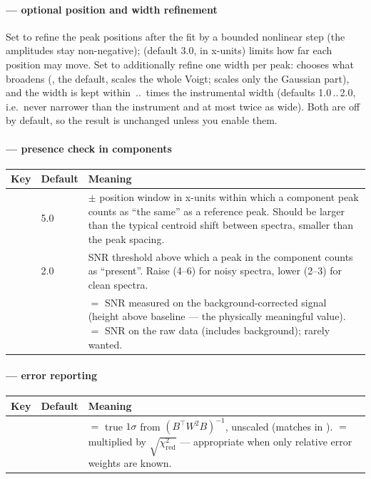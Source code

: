 \documentclass[11pt,a4paper]{article}
\begin{document}
\paragraph{\code{[refine]} --- optional position and width refinement}
Set  to refine the peak positions after the fit by a bounded
nonlinear step (the amplitudes stay non-negative);  (default
3.0, in x-units) limits how far each position may move. Set
 to additionally refine one width per peak:
 chooses what broadens (, the default, scales the
whole Voigt;  scales only the Gaussian part), and the width is kept
within \,..\, times the instrumental
width (defaults 1.0\,..\,2.0, i.e.\ never narrower than the instrument and at most
twice as wide). Both are off by default, so the result is unchanged unless you
enable them.

\paragraph{\code{[presence]} --- presence check in components}
\begin{table}[h]\small\centering
\begin{tabularx}{\linewidth}{@{}l l L@{}}
\toprule
\textbf{Key} & \textbf{Default} & \textbf{Meaning}\\
\midrule
{} & 5.0 & $\pm$ position window in x-units within which a component peak counts as ``the same'' as a reference peak. Should be larger than the typical centroid shift between spectra, smaller than the peak spacing.\\
 & 2.0 & SNR threshold above which a peak in the component counts as ``present''. Raise (4--6) for noisy spectra, lower (2--3) for clean spectra.\\
 &  &  $=$ SNR measured on the background-corrected signal (height above baseline --- the physically meaningful value).  $=$ SNR on the raw data (includes background); rarely wanted.\\
\bottomrule
\end{tabularx}
\end{table}

\paragraph{\code{[errors]} --- error reporting}
\begin{table}[h]\small\centering
\begin{tabularx}{\linewidth}{@{}l l L@{}}
\toprule
\textbf{Key} & \textbf{Default} & \textbf{Meaning}\\
\midrule
{} &  &  $=$ true $1\sigma$ from $(B^{\top}W^2B)^{-1}$, unscaled (matches  in ).  $=$ multiplied by $\sqrt{\chi^2_\mathrm{red}}$ --- appropriate when only relative error weights are known.\\
\bottomrule
\end{tabularx}
\end{table}
\end{document}
